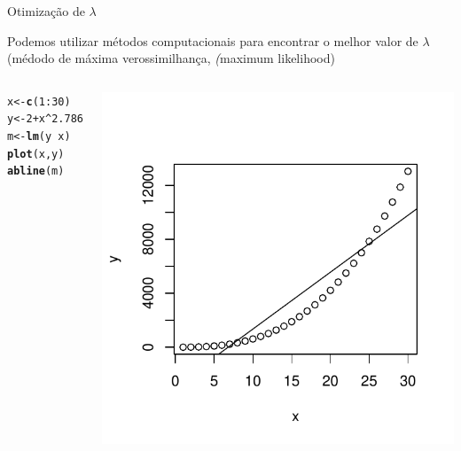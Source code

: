 \documentclass{beamer}\usepackage[]{graphicx}\usepackage[]{color}
\makeatletter
\newcommand{\hlnum}[1]{\textcolor[rgb]{0.686,0.059,0.569}{#1}}%
\newcommand{\hlopt}[1]{\textcolor[rgb]{0,0,0}{#1}}%
\newcommand{\hlstd}[1]{\textcolor[rgb]{0.345,0.345,0.345}{#1}}%
\newcommand{\hlkwb}[1]{\textcolor[rgb]{0.69,0.353,0.396}{#1}}%
\newcommand{\hlkwd}[1]{\textcolor[rgb]{0.737,0.353,0.396}{\textbf{#1}}}%
\newenvironment{kframe}{%
 \def\at@end@of@kframe{}%
 \ifinner\ifhmode%
  \def\at@end@of@kframe{\end{minipage}}%
  \begin{minipage}{\columnwidth}%
 \fi\fi%
 \def\FrameCommand##1{\hskip\@totalleftmargin \hskip-\fboxsep
 \colorbox{shadecolor}{##1}\hskip-\fboxsep
     \hskip-\linewidth \hskip-\@totalleftmargin \hskip\columnwidth}%
 \MakeFramed {\advance\hsize-\width
   \@totalleftmargin\z@ \linewidth\hsize
   \@setminipage}}%
 {\par\unskip\endMakeFramed%
 \at@end@of@kframe}
\newenvironment{knitrout}{}{} %
\renewenvironment{knitrout}{\setlength{\topsep}{0mm}}{}
\makeatother
\begin{document}
\begin{frame}[fragile]{Otimização de $\lambda$}

 Podemos utilizar métodos computacionais para encontrar o melhor valor de $\lambda$ (médodo de máxima verossimilhança, \emph(maximum likelihood)

\begin{columns}[c]


\begin{knitrout}\tiny
{}\color{fgcolor}\begin{kframe}
\begin{alltt}
\hlstd{x} \hlkwb{<-} \hlkwd{c}\hlstd{(}\hlnum{1}\hlopt{:}\hlnum{30}\hlstd{)}
\hlstd{y} \hlkwb{<-} \hlnum{2} \hlopt{+} \hlstd{x}\hlopt{^}\hlnum{2.786}
\hlstd{m} \hlkwb{<-}\hlkwd{lm}\hlstd{(y}\hlopt{~}\hlstd{x)}
\hlkwd{plot}\hlstd{(x,y)}
\hlkwd{abline}\hlstd{(m)}
\end{alltt}
\end{kframe}
\end{knitrout}


\centering
\begin{knitrout}\scriptsize
{}\color{fgcolor}
\includegraphics[width=0.9\linewidth]{figure/oti2-1} 

\end{knitrout}

\end{columns}

\end{frame}
\end{document}
